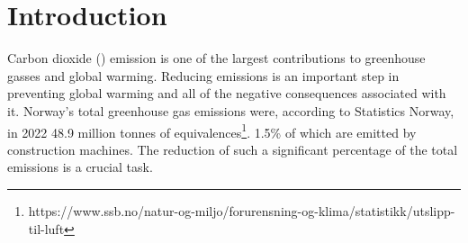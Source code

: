 \documentclass[conference]{IEEEtran}
\begin{document}
	\begin{abstract}
		\coo{} gas is one of the major contributors to greenhouse gases. Reducing greenhouse gases is an essential
		task in reducing the environmental impacts of global warming. From extreme weather to the ruin of ecosystems
		and mass extinctions, it is clear that global warming, caused by greenhouse gases, is a major existential issue.
		In Norway, 1.5\% of the total \coo{} emissions come from construction machines. Given the total greenhouse gas
		emissions adding up to almost 50 million metric tonnes of \coo{} equivalences, a reduction in emissions from
		construction machines will lead to a significant reduction in the country's total emissions.

		Although there have been studies conducted that use Reinforcement Learning techniques to reduce emissions by
		optimizing routes and scheduling, our attempt in this paper is to extend this to the use of Multi-Agent
		Reinforcement Learning techniques. The field of Multi-Agent Reinforcement Learning has gained more and more
		applications.

		This paper demonstrates implementations of Multi-Agent versions of two well-tested Reinforcement Learning
		methods: Proximal Policy Optimization and Deep Q-Networks. This paper shows the promising results of how
		Multi-Agent Reinforcement Learning could be used to reduce \coo{} emissions, but it also highlights many ways in
		which these methods can be improved.


		Index Terms - Multi-Agent Reinforcement Learning (MARL),
	\end{abstract}


	\section{Introduction}
	Carbon dioxide (\coo{}) emission is one of the largest contributions to greenhouse gasses and global warming.
	Reducing \coo{} emissions is an important step in preventing global warming and all of the negative
	consequences associated with it. Norway's total greenhouse gas emissions were, according to Statistics
	Norway, in 2022 48.9 million tonnes of \coo{}
	equivalences\footnote{https://www.ssb.no/natur-og-miljo/forurensning-og-klima/statistikk/utslipp-til-luft}.
	1.5\% of which are emitted by construction machines. \cite{noraRoadAIReducing} The reduction of such
	a significant percentage of the total emissions is a crucial task.
\end{document}
